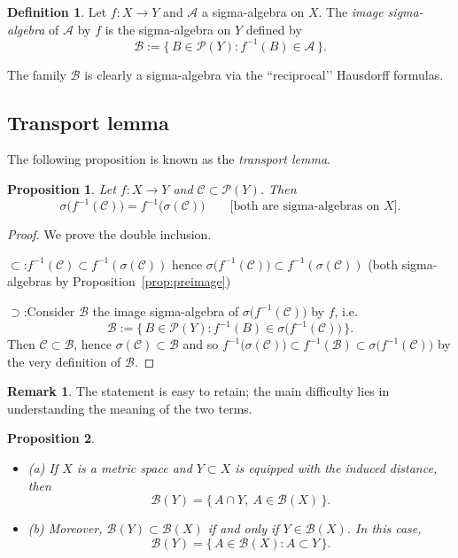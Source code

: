 \documentclass[11pt]{article}
\newtheorem{proposition}{Proposition}[section]
\theoremstyle{definition}
\newtheorem{definition}{Definition}[section]
\newtheorem{remark}{Remark}[section]
\begin{document}
\begin{definition}
Let $f:X\to Y$ and $\mathcal A$ a sigma-algebra on $X$. The \emph{image sigma-algebra} of $\mathcal A$ by $f$ is the sigma-algebra on $Y$ defined by
\[
\mathcal B:=\{\,B\in\mathcal P(Y): f^{-1}(B)\in\mathcal A\,\}.
\]
\end{definition}

The family $\mathcal B$ is clearly a sigma-algebra via the “reciprocal’’ Hausdorff formulas.

\subsection{Transport lemma}\label{subsec:3.3}

The following proposition is known as the \emph{transport lemma}.

\begin{proposition}\label{prop:transport}
Let $f:X\to Y$ and $\mathscr C\subset\mathcal P(Y)$. Then
\[
\sigma\bigl(f^{-1}(\mathscr C)\bigr)=f^{-1}\bigl(\sigma(\mathscr C)\bigr)
\qquad\text{[both are sigma-algebras on $X$].}
\]
\end{proposition}

\begin{proof}
We prove the double inclusion.

\noindent$\subset$:\quad $f^{-1}(\mathscr C)\subset f^{-1}(\sigma(\mathscr C))$ hence $\sigma\bigl(f^{-1}(\mathscr C)\bigr)\subset f^{-1}(\sigma(\mathscr C))$ (both sigma-algebras by Proposition~\ref{prop:preimage})

\noindent$\supset$:\quad Consider $\mathcal B$ the image sigma-algebra of $\sigma\bigl(f^{-1}(\mathscr C)\bigr)$ by $f$, i.e.
\[
\mathcal B:=\{\,B\in\mathcal P(Y): f^{-1}(B)\in \sigma\bigl(f^{-1}(\mathscr C)\bigr)\,\}.
\]
Then $\mathscr C\subset\mathcal B$, hence $\sigma(\mathscr C)\subset\mathcal B$ and so $f^{-1}\bigl(\sigma(\mathscr C)\bigr)\subset f^{-1}(\mathcal B)\subset \sigma\bigl(f^{-1}(\mathscr C)\bigr)$ by the very definition of $\mathcal B$.

\medskip\noindent

\end{proof}

\begin{remark}
The statement is easy to retain; the main difficulty lies in understanding the meaning of the two terms.
\end{remark}

\begin{proposition}\label{prop:traceBorel}
\begin{itemize}
\item (a) If $X$ is a metric space and $Y\subset X$ is equipped with the induced distance, then
\[
\mathcal B(Y)=\{\,A\cap Y,\ A\in\mathcal B(X)\,\}.
\]
\item (b) Moreover, $\mathcal B(Y)\subset\mathcal B(X)$ if and only if $Y\in\mathcal B(X)$. In this case,
\[
\mathcal B(Y)=\{\,A\in\mathcal B(X): A\subset Y\,\}.
\]
\end{itemize}
\end{proposition}
\end{document}
